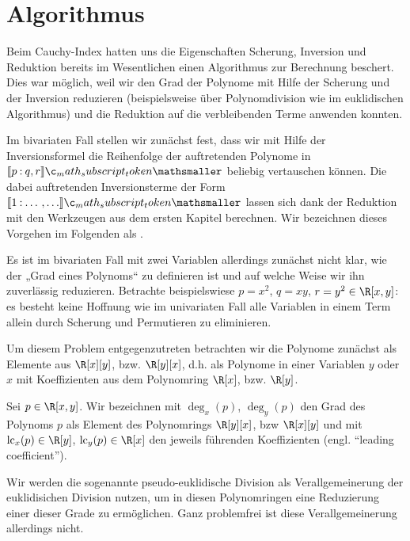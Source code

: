 \documentclass{mythesis}
\begin{document}
\section{Algorithmus}

Beim Cauchy-Index hatten uns die Eigenschaften Scherung, Inversion und Reduktion bereits im Wesentlichen einen Algorithmus zur Berechnung beschert.
Dies war möglich, weil wir den Grad der Polynome mit Hilfe der Scherung und der Inversion reduzieren (beispielsweise über Polynomdivision wie im euklidischen Algorithmus) und die Reduktion auf die verbleibenden Terme anwenden konnten.

Im bivariaten Fall stellen wir zunächst fest, dass wir mit Hilfe der Inversionsformel die Reihenfolge der auftretenden Polynome in $\Index{}{p}{q,r}$ beliebig vertauschen können.
Die dabei auftretenden Inversionsterme der Form $\Index{}{1}{\dotso, \dotso}$ lassen sich dank der Reduktion mit den Werkzeugen aus dem ersten Kapitel berechnen.
Wir bezeichnen dieses Vorgehen im Folgenden als .

Es ist im bivariaten Fall mit zwei Variablen allerdings zunächst nicht klar, wie der „Grad eines Polynoms“ zu definieren ist und auf welche Weise wir ihn zuverlässig reduzieren.
Betrachte beispielswiese $p = x^2$, $q = xy$, $r = y^2 \in \R[x,y]$: es besteht keine Hoffnung wie im univariaten Fall alle Variablen in einem Term allein durch Scherung und Permutieren zu eliminieren.

Um diesem Problem entgegenzutreten betrachten wir die Polynome zunächst als Elemente aus $\R[x][y]$, bzw. $\R[y][x]$, d.h. als Polynome in einer Variablen $y$ oder $x$ mit Koeffizienten aus dem Polynomring $\R[x]$, bzw. $\R[y]$.

\begin{definition}
    Sei $p \in \R[x,y]$.
    Wir bezeichnen mit $\deg_x(p)$, $\deg_y(p)$ den Grad des Polynoms $p$ als Element des Polynomrings $\R[y][x]$, bzw $\R[x][y]$ und mit $\lc_x(p) \in \R[y]$, $\lc_y(p) \in \R[x]$ den jeweils führenden Koeffizienten (engl. “leading coefficient”).
\end{definition}


Wir werden die sogenannte pseudo-euklidische Division als Verallgemeinerung der euklidisichen Division nutzen, um in diesen Polynomringen eine Reduzierung einer dieser Grade zu ermöglichen.
Ganz problemfrei ist diese Verallgemeinerung allerdings nicht.
\end{document}
